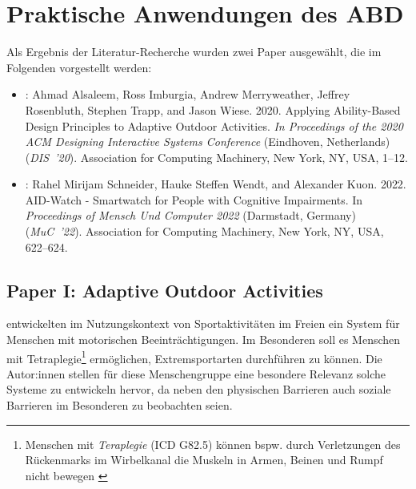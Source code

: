 \documentclass[sigchi-a,screen,nonacm,language=german]{acmart}
\theoremstyle{acmdefinition}
\begin{document}
\section{Praktische Anwendungen des ABD}
\label{sec:vorstellung}


Als Ergebnis der Literatur-Recherche wurden zwei Paper ausgewählt, die im Folgenden vorgestellt
werden:

\begin{itemize}
    \item {}: Ahmad Alsaleem, Ross Imburgia, Andrew Merryweather, Jeffrey Rosenbluth, Stephen Trapp, and Jason Wiese. 2020. Applying Ability-Based Design Principles to Adaptive Outdoor Activities. \emph{In Proceedings of the 2020 ACM Designing Interactive Systems Conference} (Eindhoven, Netherlands) (\emph{DIS~’20}). Association for Computing Machinery, New York, NY, USA, 1–12.
    
    \item {}: Rahel Mirijam Schneider, Hauke Steffen Wendt, and Alexander Kuon. 2022. AID-Watch - Smartwatch for People with Cognitive Impairments. In \emph{Proceedings of Mensch Und Computer 2022} (Darmstadt, Germany) (\emph{MuC~’22}). Association for Computing Machinery, New York, NY, USA, 622–624.
\end{itemize}


\subsection{Paper I: Adaptive Outdoor Activities}
\label{sec:vorstellung:lit-1}




\citet{alsaleem:2020:adaptive-outdoor-activities} entwickelten im Nutzungskontext von Sportaktivitäten im Freien ein System für Menschen mit motorischen Beeinträchtigungen. Im Besonderen soll es Menschen mit Tetraplegie\footnote{Menschen mit \emph{Teraplegie} (ICD G82.5) können bspw. durch Verletzungen des Rückenmarks im Wirbelkanal die Muskeln in Armen, Beinen und Rumpf nicht bewegen \citep{bmg:icd-code}} ermöglichen, Extremsportarten durchführen zu können. Die Autor:innen stellen für diese Menschengruppe eine besondere Relevanz solche Systeme zu entwickeln hervor, da neben den physischen Barrieren auch soziale Barrieren im Besonderen zu beobachten seien.
\end{document}
